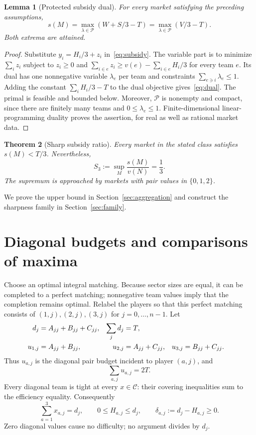 \documentclass[11pt]{article}
\newtheorem{theorem}{Theorem}[section]
\newtheorem{lemma}[theorem]{Lemma}
\theoremstyle{remark}
\newcommand{\core}{\mathcal C}
\newcommand{\pack}{\mathcal P}
\begin{document}
\begin{lemma}[Protected subsidy dual]\label{lem:dual}
For every market satisfying the preceding assumptions,
\begin{equation}\label{eq:dual}
                  s(M)=\max_{\lambda\in\pack}(W+S/3-T)
                       =\max_{\lambda\in\pack}(V/3-T).
\end{equation}
Both extrema are attained.
\end{lemma}
\begin{proof}
Substitute $y_i=H_i/3+z_i$ in~\eqref{eq:subsidy}. The variable part is
to minimize $\sum_i z_i$ subject to $z_i\ge0$ and
$\sum_{i\in e}z_i\ge v(e)-\sum_{i\in e}H_i/3$ for every team $e$.
Its dual has one nonnegative variable $\lambda_e$ per team and constraints
$\sum_{e\ni i}\lambda_e\le1$. Adding the constant
$\sum_iH_i/3-T$ to the dual objective gives~\eqref{eq:dual}.
The primal is feasible and bounded below. Moreover, $\pack$ is nonempty
and compact, since there are finitely many teams and $0\le\lambda_e\le1$.
Finite-dimensional linear-programming duality proves the assertion, for
real as well as rational market data.
\end{proof}

\begin{theorem}[Sharp subsidy ratio]\label{thm:main}
Every market in the stated class satisfies $s(M)<T/3$. Nevertheless,
\begin{equation}\label{eq:sharp}
             S_3:=\sup_M\frac{s(M)}{v(N)}=\frac13.
\end{equation}
The supremum is approached by markets with pair values in $\{0,1,2\}$.
\end{theorem}
We prove the upper bound in Section~\ref{sec:aggregation} and construct the
sharpness family in Section~\ref{sec:family}.

\section{Diagonal budgets and comparisons of maxima}\label{sec:comparisons}
Choose an optimal integral matching. Because sector sizes are equal, it
can be completed to a perfect matching; nonnegative team values imply
that the completion remains optimal. Relabel the players so that this
perfect matching consists of $(1,j),(2,j),(3,j)$ for $j=0,\ldots,n-1$.
Let
\begin{align}
 d_j&=A_{jj}+B_{jj}+C_{jj}, &\sum_jd_j&=T,\label{eq:diagonal}\\
 u_{1,j}&=A_{jj}+B_{jj},&u_{2,j}&=A_{jj}+C_{jj},
 &u_{3,j}&=B_{jj}+C_{jj}.\notag
\end{align}
Thus $u_{a,j}$ is the diagonal pair budget incident to player $(a,j)$, and
\begin{equation}\label{eq:budget}
                     \sum_{a,j}u_{a,j}=2T.
\end{equation}
Every diagonal team is tight at every $x\in\core$: their covering
inequalities sum to the efficiency equality. Consequently
\begin{equation}\label{eq:caps}
     \sum_{a=1}^3x_{a,j}=d_j,\qquad
     0\le H_{a,j}\le d_j,\qquad
     \delta_{a,j}:=d_j-H_{a,j}\ge0.
\end{equation}
Zero diagonal values cause no difficulty; no argument divides by $d_j$.
\end{document}
